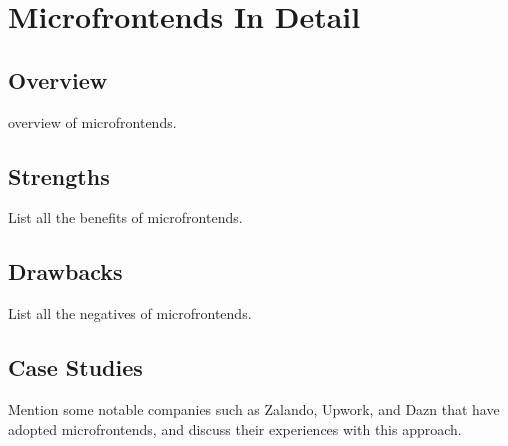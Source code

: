 \section{Microfrontends In Detail}
\subsection{Overview}
overview of microfrontends.
\subsection{Strengths}
List all the benefits of microfrontends.
\subsection{Drawbacks}
List all the negatives of microfrontends.
\subsection{Case Studies}
Mention some notable companies such as Zalando, Upwork, and Dazn that have adopted microfrontends, and discuss their experiences with this approach.
